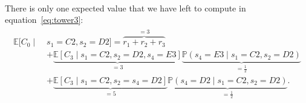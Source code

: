 %
\hphantom{aha} \\[-2ex]
%
%
There is only one expected value that we have left to compute in
equation~\eqref{eq:tower3}:
%
\vspace{-2mm}
\begin{align*}
    \begin{split}
    \mathbb{E}[C_0 \mid \; &s_1=C2, s_2=D2] = \overbrace{r_1 + r_2 + r_3}^{=3} \\
    &+ \underbrace{\mathbb{E}[C_3 \mid s_1=C2, s_2=D2, s_4=E3]}_{=3} \underbrace{\mathbb{P}(s_4=E3 \mid s_1=C2, s_2=D2)}_{=\frac{1}{2}} \\
    &+ \underbrace{\mathbb{E}[C_3 \mid s_1=C2, s_2=s_4=D2]}_{=5} \underbrace{\mathbb{P}(s_4=D2 \mid s_1=C2, s_2=D2)}_{=\frac{1}{2}}.
    \end{split}
\end{align*}
%
\hphantom{aha} \\[-2ex]

